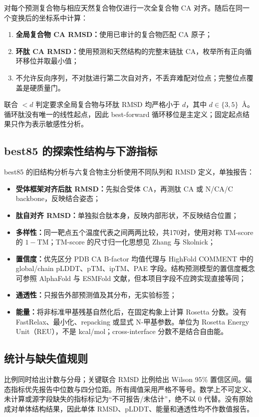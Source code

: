 对每个预测复合物与相应天然复合物仅进行一次全复合物 CA 对齐。随后在同一个变换后的坐标系中计算：

\begin{enumerate}
  \item \textbf{全局复合物 CA RMSD：}使用已审计的复合物匹配 CA 原子；
  \item \textbf{环肽 CA RMSD：}使用预测和天然结构的完整末链肽 CA，枚举所有正向循环移位并取最小值；
  \item 不允许反向序列，不对肽进行第二次自对齐，不丢弃难配对位点；完整位点覆盖是硬质量门。
\end{enumerate}

联合 $<d$ 判定要求全局复合物与环肽 RMSD 均严格小于 $d$，其中 $d\in\{3,5\}$~\AA。循环肽没有唯一的线性起点，因此 best-forward 循环移位是主定义；固定起点结果只作为表示敏感性分析。

\subsection{best85 的探索性结构与下游指标}

best85 的旧结构分析与六复合物主分析使用不同队列和 RMSD 定义，单独报告：

\begin{itemize}
  \item \textbf{受体框架对齐后肽 RMSD：}先拟合受体 CA，再测肽 CA 或 N/CA/C backbone，反映结合姿态；
  \item \textbf{肽自对齐 RMSD：}单独拟合肽本身，反映内部形状，不反映结合位置；
  \item \textbf{多样性：}同一靶点五个温度代表之间两两比较，共170对，使用对称 TM-score 的 $1-\mathrm{TM}$；TM-score 的尺寸归一化思想见 Zhang 与 Skolnick\cite{zhang2004tmscore}；
  \item \textbf{置信度：}优先区分 PDB CA B-factor 均值代理与 HighFold COMMENT 中的 global/chain pLDDT、pTM、ipTM、PAE 字段。结构预测模型的置信度概念可参照 AlphaFold 与 ESMFold 文献\cite{jumper2021alphafold,lin2023esmfold}，但本项目字段不应跨实现直接等同；
  \item \textbf{通透性：}只报告外部预测值及其分布，无实验标签；
  \item \textbf{能量：}将非标准甲基残基自然化后，在固定构象上计算 Rosetta 分数。没有 FastRelax、最小化、repacking 或显式 N-甲基参数。单位为 Rosetta Energy Unit（REU），不是 kcal/mol；cross-interface 分数不是结合自由能\cite{chaudhury2010pyrosetta,leaverfay2011rosetta3}。
\end{itemize}

\subsection{统计与缺失值规则}

比例同时给出计数与分母；关键联合 RMSD 比例给出 Wilson 95\% 置信区间。偏态指标优先报告中位数与四分位距。所有阈值采用严格不等号。数学上不可定义、未计算或源字段缺失的指标标记为“不可报告/未估计”，绝不以 0 代替。没有原始成对单体结构结果，因此单体 RMSD、pLDDT、能量和通透性均不作数值报告。

